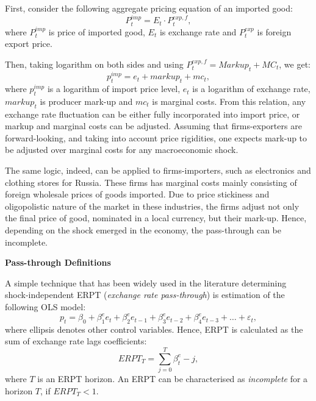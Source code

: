 \documentclass[12pt, a4paper]{extarticle}
\begin{document}
First, consider the following aggregate pricing equation of an imported good:
\begin{equation}
	P_t^{imp} = E_t \cdot P_t^{exp, f},
\end{equation}
where $P_t^{imp}$ is price of imported good, $E_t$ is exchange rate and $P_t^{exp}$ is foreign export price. 

Then, taking logarithm on both sides and using $P_t^{exp, f} = Markup_t + MC_t$, we get:
\begin{equation}
	p_t^{imp} = e_t + markup_t + mc_t,
\end{equation}
where $p_t^{imp}$ is a logarithm of import price level, $e_t$ is a logarithm of exchange rate, $markup_t$ is producer mark-up and $mc_t$ is marginal costs. From this relation, any exchange rate fluctuation can be either fully incorporated into import price, or markup and marginal costs can be adjusted. Assuming that firms-exporters are forward-looking, and taking into account price rigidities, one expects mark-up to be adjusted over marginal costs for any macroeconomic shock. 

The same logic, indeed, can be applied to firms-importers, such as electronics and clothing stores for Russia. These firms has marginal costs mainly consisting of foreign wholesale prices of goods imported. Due to price stickiness and oligopolistic nature of the market in these industries, the firms adjust not only the final price of good, nominated in a local currency, but their mark-up. Hence, depending on the shock emerged in the economy, the pass-through can be incomplete.

\begin{center}
	\textbf{Pass-through Definitions}
\end{center}

A simple technique that has been widely used in the literature determining shock-in\-de\-pen\-dent ERPT (\textit{exchange rate pass-through}) is estimation of the following OLS model:
\begin{equation}
	p_t = \beta_0 + \beta^{e}_1 e_t + \beta^{e}_2 e_{t-1} + \beta^{e}_3 e_{t-2} + \beta^{e}_4 e_{t-3} + \ldots+ \varepsilon_t,
\end{equation}
where ellipsis denotes other control variables. Hence, ERPT is calculated as the sum of exchange rate lags coefficients:
\begin{equation}
	ERPT_T = \sum_{j=0}^{T} \beta^e_t-j,
\end{equation}
where $T$ is an ERPT horizon. An ERPT can be characterised as \textit{incomplete} for a horizon $T$, if $ERPT_T < 1$. 
\end{document}
